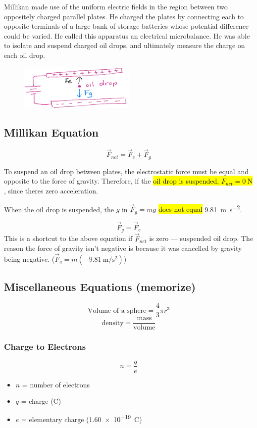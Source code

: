 \documentclass[a4paper,12pt]{article}
\begin{document}
Millikan made use of the uniform electric fields in the region between two oppositely charged parallel plates. He charged the plates by connecting each to opposite terminals of a large bank of storage batteries whose potential difference could be varied. He called this apparatus an electrical microbalance. He was able to isolate and suspend charged oil drops, and ultimately measure the charge on each oil drop.

\begin{figure}[H]
    \centering
    \includegraphics[width=0.50\textwidth]{oil}
\end{figure}
\subsection{Millikan Equation}
\Large $$\vec{F}_{net} = \vec{F}_e + \vec{F}_g$$ \normalsize

To suspend an oil drop between plates, the electrostatic force must be equal and opposite to the force of gravity. Therefore, if the \hl{oil drop is suspended, $F_{net} = \SI{0}{\newton}$}, since theres zero acceleration.

When the oil drop is suspended, the $g$ in $\vec{F}_g = mg$ \hl{does not equal} \SI{9.81}{\m\per\s\squared}.

\Large $$\vec{F}_g = \vec{F}_e$$ \normalsize
This is a shortcut to the above equation if $\vec{F}_{net}$ is zero --- suspended oil drop. The reason the force of gravity isn't negative is because it was cancelled by gravity being negative. ($\vec{F}_g = m(\SI{-9.81}{\m\per\s\squared})$)

\subsection{Miscellaneous Equations (memorize)}
$$\textrm{Volume of a sphere} = \frac{4}{3}\pi r^3$$
$$\textrm{density} = \frac{\textrm{mass}}{\textrm{volume}}$$

\subsubsection{Charge to Electrons}
\Large$$n = \frac{q}{e}$$\normalsize
\begin{itemize}
    \item{$n$ = number of electrons}
    \item{$q$ = charge (\si{\coulomb})}
    \item{$e$ = elementary charge (\SI{1.60e-19}{\coulomb})}
\end{itemize}
\end{document}
